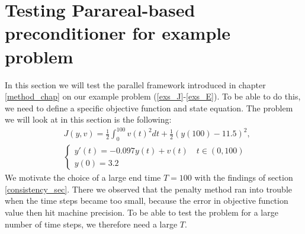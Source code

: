 \section{Testing Parareal-based preconditioner for example problem}
In this section we will test the parallel framework introduced in chapter \ref{method_chap} on our example problem (\ref{exs_J}-\ref{exs_E}). To be able to do this, we need to define a specific objective function and state equation. The problem we will look at in this section is the following:
\begin{align}
&J(y,v) = \frac{1}{2}\int_0^{100}v(t)^2dt + \frac{1}{2}(y(100)-11.5)^2, \label{speed_j}\\
&\left\{
     \begin{array}{lr}
       	y'(t)=-0.097y(t) + v(t) \quad t\in(0,100)\\
       	y(0)=3.2
     \end{array}
   \right. \label{speed_e}
\end{align}
We motivate the choice of a large end time $T=100$ with the findings of section \ref{consistency_sec}. There we observed that the penalty method ran into trouble when the time steps became too small, because the error in objective function value then hit machine precision. To be able to test the problem for a large number of time steps, we therefore need a large $T$. 
